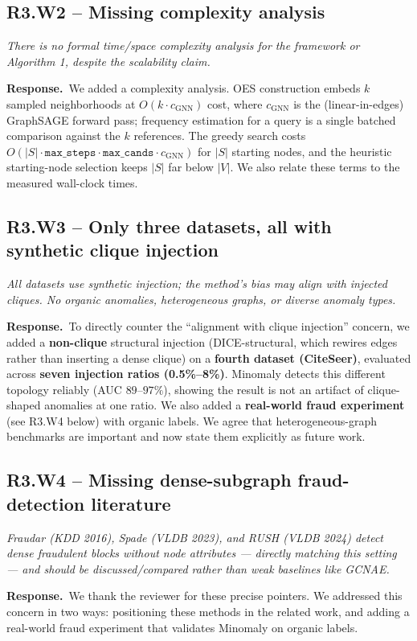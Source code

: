 \documentclass[11pt]{article}
\newcommand{\comment}[1]{\begin{reviewerbox}\itshape #1\end{reviewerbox}}
\newcommand{\response}{\par\noindent\textbf{\textcolor{respgreen}{Response.}}\ }
\begin{document}
\subsection*{R3.W2 -- Missing complexity analysis}
\comment{There is no formal time/space complexity analysis for the framework or Algorithm 1, despite the scalability claim.}
\response We added a complexity analysis. OES construction embeds $k$ sampled neighborhoods at $O(k \cdot c_{\text{GNN}})$ cost, where $c_{\text{GNN}}$ is the (linear-in-edges) GraphSAGE forward pass; frequency estimation for a query is a single batched comparison against the $k$ references. The greedy search costs $O(|S| \cdot \texttt{max\_steps} \cdot \texttt{max\_cands} \cdot c_{\text{GNN}})$ for $|S|$ starting nodes, and the heuristic starting-node selection keeps $|S|$ far below $|V|$. We also relate these terms to the measured wall-clock times.

\subsection*{R3.W3 -- Only three datasets, all with synthetic clique injection}
\comment{All datasets use synthetic injection; the method's bias may align with injected cliques. No organic anomalies, heterogeneous graphs, or diverse anomaly types.}
\response To directly counter the ``alignment with clique injection'' concern, we added a \textbf{non-clique} structural injection (DICE-structural, which rewires edges rather than inserting a dense clique) on a \textbf{fourth dataset (CiteSeer)}, evaluated across \textbf{seven injection ratios (0.5\%--8\%)}. Minomaly detects this different topology reliably (AUC $89$--$97\%$), showing the result is not an artifact of clique-shaped anomalies at one ratio. We also added a \textbf{real-world fraud experiment} (see R3.W4 below) with organic labels. We agree that heterogeneous-graph benchmarks are important and now state them explicitly as future work.

\subsection*{R3.W4 -- Missing dense-subgraph fraud-detection literature}
\comment{Fraudar (KDD 2016), Spade (VLDB 2023), and RUSH (VLDB 2024) detect dense fraudulent blocks without node attributes --- directly matching this setting --- and should be discussed/compared rather than weak baselines like GCNAE.}
\response We thank the reviewer for these precise pointers. We addressed this concern in two ways: positioning these methods in the related work, and adding a real-world fraud experiment that validates Minomaly on organic labels.
\end{document}
